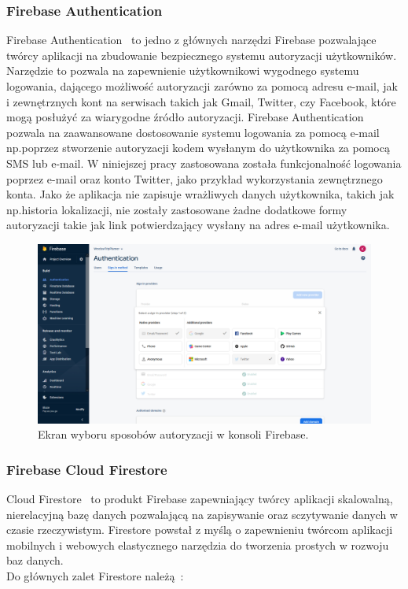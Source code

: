         \subsubsection{Firebase Authentication}
        Firebase Authentication~\cite{FIREBASE_AUTH} to jedno z głównych narzędzi Firebase pozwalające twórcy aplikacji na zbudowanie bezpiecznego systemu autoryzacji użytkowników. \\
        Narzędzie to pozwala na zapewnienie użytkownikowi wygodnego systemu logowania, dającego możliwość autoryzacji zarówno za pomocą adresu e-mail, jak i zewnętrznych kont na serwisach takich
        jak Gmail, Twitter, czy Facebook, które mogą posłużyć za wiarygodne źródło autoryzacji. Firebase Authentication pozwala na zaawansowane dostosowanie systemu logowania za pomocą
        e-mail np.\@ poprzez stworzenie autoryzacji kodem wysłanym do użytkownika za pomocą SMS lub e-mail. W niniejszej pracy zastosowana została funkcjonalność logowania poprzez e-mail 
        oraz konto Twitter, jako przykład wykorzystania zewnętrznego konta. Jako że aplikacja nie zapisuje wrażliwych danych użytkownika, takich jak np.\@ historia lokalizacji, nie zostały
        zastosowane żadne dodatkowe formy autoryzacji takie jak link potwierdzający wysłany na adres e-mail użytkownika.
        
        \vspace{1cm}
        \begin{figure}[!ht]%
            \centering
            \includegraphics[scale=0.30]{src/firebase auth.png}
            \caption{Ekran wyboru sposobów autoryzacji w konsoli Firebase.\label{firebase_auth}}
            \qquad
        \end{figure} 

\newpage
        \subsubsection{Firebase Cloud Firestore}
        Cloud Firestore~\cite{FIREBASE_FIRESTORE} to produkt Firebase zapewniający twórcy aplikacji skalowalną, nierelacyjną bazę danych pozwalającą na zapisywanie oraz sczytywanie danych w 
        czasie rzeczywistym. Firestore powstał z myślą o zapewnieniu twórcom aplikacji mobilnych i webowych elastycznego narzędzia do tworzenia prostych w rozwoju baz danych. \\
        Do głównych zalet Firestore należą~\cite{FIRESTORE_DOCS}: \\
        
